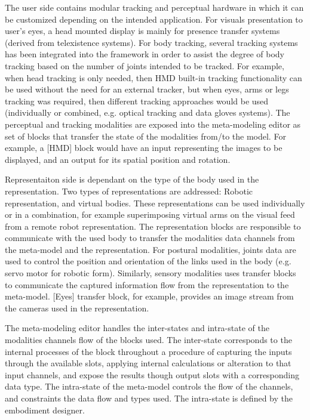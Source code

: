 The user side contains modular tracking and perceptual hardware in which it can be customized depending on the intended application. For visuals presentation to user's eyes, a head mounted display is mainly for presence transfer systems (derived from telexistence systems). For body tracking, several tracking systems has been integrated into the framework in order to assist the degree of body tracking based on the number of joints intended to be tracked. For example, when head tracking is only needed, then HMD built-in tracking functionality can be used without the need for an external tracker, but when eyes, arms or legs tracking was required, then different tracking approaches would be used (individually or combined, e.g. optical tracking and data gloves systems). The perceptual and tracking modalities are exposed into the meta-modeling editor as set of blocks that transfer the state of the modalities from/to the model. For example, a [HMD] block would have an input representing the images to be displayed, and an output for its spatial position and rotation. 

Representaiton side is dependant on the type of the body used in the representation. Two types of representations are addressed: Robotic representation, and virtual bodies. These representations can be used individually or in a combination, for example superimposing virtual arms on the visual feed from a remote robot representation. The representation blocks are responsible to communicate with the used body to transfer the modalities data channels from the meta-model and the representation. For postural modalities, joints data are used to control the position and orientation of the links used in the body (e.g. servo motor for robotic form). Similarly, sensory modalities uses transfer blocks to communicate the captured information flow from the representation to the meta-model. [Eyes] transfer block, for example, provides an image stream from the cameras used in the representation.


The meta-modeling editor handles the inter-states and intra-state of the modalities channels flow of the blocks used. The inter-state corresponds to the internal processes of the block throughout a procedure of capturing the inputs through the available slots, applying internal calculations or alteration to that input channels, and expose the results though output slots with a corresponding data type. The intra-state of the meta-model controls the flow of the channels, and constraints the data flow and types used. The intra-state is defined by the embodiment designer.


